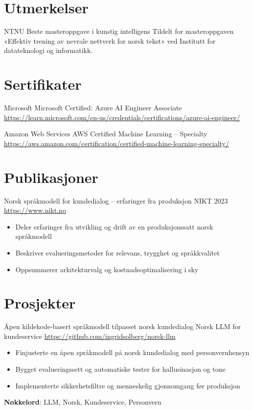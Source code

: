 \documentclass[a4paper, serif, 10pt]{moderncv}
\begin{document}
\section{Utmerkelser}

        {NTNU}
        {Beste masteroppgave i kunstig intelligens}
        {}
        {}
        {Tildelt for masteroppgaven «Effektiv trening av nevrale nettverk for norsk tekst» ved Institutt for datateknologi og informatikk.}
\section{Sertifikater}

        {Microsoft}
        {Microsoft Certified: Azure AI Engineer Associate}
        {\url{https://learn.microsoft.com/en-us/credentials/certifications/azure-ai-engineer/}}
        {}
        {}

        {Amazon Web Services}
        {AWS Certified Machine Learning – Specialty}
        {\url{https://aws.amazon.com/certification/certified-machine-learning-specialty/}}
        {}
        {}
\section{Publikasjoner}

        {Norsk språkmodell for kundedialog – erfaringer fra produksjon}
        {NIKT 2023}
        {\url{https://www.nikt.no}}
        {}
        {\begin{itemize}
\item Deler erfaringer fra utvikling og drift av en produksjonssatt norsk språkmodell
\item Beskriver evalueringsmetoder for relevans, trygghet og språkkvalitet
\item Oppsummerer arkitekturvalg og kostnadsoptimalisering i sky
\end{itemize}}
\section{Prosjekter}

        {Åpen kildekode-basert språkmodell tilpasset norsk kundedialog}
        {Norsk LLM for kundeservice}
        {\url{https://github.com/ingridsolberg/norsk-llm}}
        {}
        {\begin{itemize}
\item Finjusterte en åpen språkmodell på norsk kundedialog med personvernhensyn
\item Bygget evalueringssett og automatiske tester for hallusinasjon og tone
\item Implementerte sikkerhetsfiltre og menneskelig gjennomgang før produksjon
\end{itemize}
\textbf{Nøkkelord}: LLM, Norsk, Kundeservice, Personvern}
\end{document}
